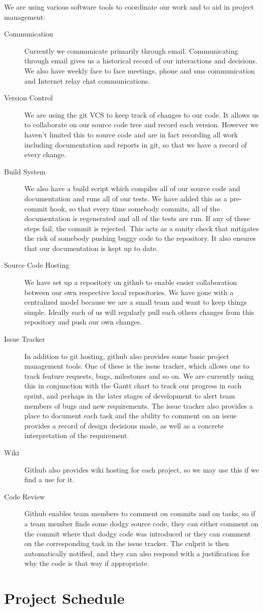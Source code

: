 \documentclass{article}
\begin{document}
We are using various software tools to coordinate our work and to aid in project management:
\begin{description}
  \item[Communication] Currently we communicate primarily through email. Communicating through email gives us a historical record of our interactions and decisions. We also have weekly face to face meetings, phone and sms communication and Internet relay chat communications.
  \item[Version Control] We are using the git VCS to keep track of changes to our code. It allows us to collaborate on our source code tree and record each version. However we haven't limited this to source code and are in fact recording all work including documentation and reports in git, so that we have a record of every change.
  \item[Build System] We also have a build script which compiles all of our source code and documentation and runs all of our tests. We have added this as a pre-commit hook, so that every time somebody commits, all of the documentation is regenerated and all of the tests are run. If any of these steps fail, the commit is rejected. This acts as a sanity check that mitigates the risk of somebody pushing buggy code to the repository. It also ensures that our documentation is kept up to date.
  \item[Source Code Hosting] We have set up a repository on github to enable easier collaboration between our own respective local repositories. We have gone with a centralized model because we are a small team and want to keep things simple. Ideally each of us will regularly pull each others changes from this repository and push our own changes.
  \item[Issue Tracker] In addition to git hosting, github also provides some basic project management tools. One of these is the issue tracker, which allows one to track feature requests, bugs, milestones and so on. We are currently using this in conjunction with the Gantt chart to track our progress in each sprint, and perhaps in the later stages of development to alert team members of bugs and new requirements. The issue tracker also provides a place to document each task and the ability to comment on an issue provides a record of design decisions made, as well as a concrete interpretation of the requirement.
  \item[Wiki] Github also provides wiki hosting for each project, so we may use this if we find a use for it.
  \item[Code Review] Github enables team members to comment on commits and on tasks, so if a team member finds some dodgy source code, they can either comment on the commit where that dodgy code was introduced or they can comment on the corresponding task in the issue tracker. The culprit is then automatically notified, and they can also respond with a justification for why the code is that way if appropriate.
\end{description}


\appendix
\section{Project Schedule}

\end{document}

